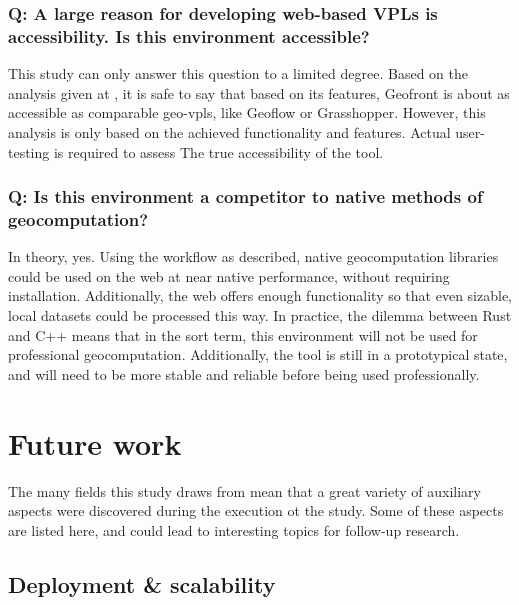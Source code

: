 
\subsubsection*{Q: A large reason for developing web-based VPLs is accessibility.  Is this environment accessible?}

This study can only answer this question to a limited degree. 
Based on the analysis given at , it is safe to say that based on its features, Geofront is about as accessible as comparable geo-vpls, like Geoflow or Grasshopper. 
However, this analysis is only based on the achieved functionality and features. 
Actual user-testing is required to assess The true accessibility of the tool.

\subsubsection*{Q: Is this environment a competitor to native methods of geocomputation?}

In theory, yes.
Using the workflow as described, native geocomputation libraries could be used on the web at near native performance, without requiring installation.
Additionally, the web offers enough functionality so that even sizable, local datasets could be processed this way.
In practice, the dilemma between Rust and C++ means that in the sort term, this environment will not be used for professional geocomputation.
Additionally, the tool is still in a prototypical state, and will need to be more stable and reliable before being used professionally. 


\section{Future work}
\label{sec:future-work}
The many fields this study draws from mean that a great variety of auxiliary aspects were discovered during the execution ot the study. 
Some of these aspects are listed here, and could lead to interesting topics for follow-up research. 

\subsection{Deployment \& scalability}

